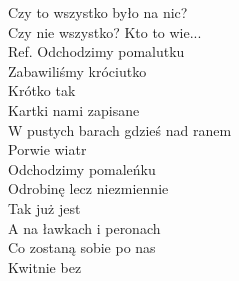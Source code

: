 \newpage
Czy to wszystko było na nic? \\
Czy nie wszystko? Kto to wie... \\
\hops
Ref. Odchodzimy pomalutku\\
 Zabawiliśmy króciutko  \\
 Krótko tak \\
 Kartki nami zapisane \\
 W pustych barach gdzieś nad ranem \\
 Porwie wiatr \\
\hops
{} Odchodzimy pomaleńku \\
 Odrobinę lecz niezmiennie \\
 Tak już jest \\
 A na ławkach i peronach \\
 Co zostaną sobie po nas \\
 Kwitnie bez